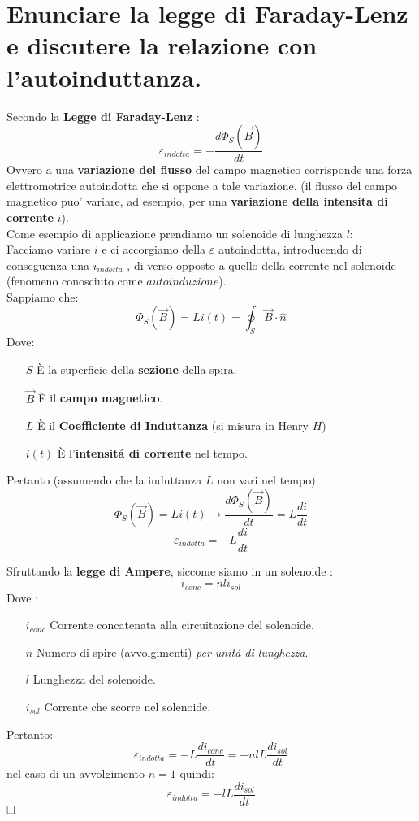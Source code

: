\section{Enunciare la legge di Faraday-Lenz e discutere la
	relazione con l'autoinduttanza.}
Secondo la \textbf{Legge di Faraday-Lenz} :
\begin{equation}
	\varepsilon_{indotta} = -\frac{d\Phi_S(\vec{B})}{dt}
\end{equation}
Ovvero a una \textbf{variazione del flusso} del campo magnetico corrisponde una forza elettromotrice autoindotta che si oppone a tale variazione. (il flusso del campo magnetico puo' variare, ad esempio, per una \textbf{variazione della intensita di corrente} $i$).\\
Come esempio di applicazione prendiamo un solenoide di lunghezza $l$:\\
Facciamo variare $i$ e ci accorgiamo della $\varepsilon$ autoindotta, introducendo di conseguenza una $i_{indotta}$ , di verso opposto a quello della corrente nel solenoide (fenomeno conosciuto come $autoinduzione$).\\
Sappiamo che:
$$
    \Phi_S(\vec{B}) = Li(t) = \oint_S{\vec{B} \cdot \hat{n}}
$$
Dove:
\begin{itemize}
	\item [$S$] {
	    \`E la superficie della \textbf{sezione} della spira.	
	}
	\item [$\vec{B}$] {
	    \`E il \textbf{campo magnetico}.
	}
	\item [$L$] {
		\`E il \textbf{Coefficiente di Induttanza} (si misura in Henry $H$)
	}
	\item[$i(t)$] {
	    \`E l'\textbf{intensit\'a di corrente} nel tempo.
	}
\end{itemize}
Pertanto (assumendo che la induttanza $L$ non vari nel tempo):
$$
    \Phi_S(\vec{B}) = Li(t) \rightarrow \frac{d\Phi_S(\vec{B})}{dt} = L\frac{di}{dt}
$$
$$
    \varepsilon_{indotta} = -L\frac{di}{dt}
$$

\pagebreak

\noindent Sfruttando la \textbf{legge di Ampere}, siccome siamo in un solenoide :
$$
    i_{conc} = n l i_{sol}
$$
\noindent Dove : 
\begin{itemize}
    \item [$i_{conc}$] {
    	Corrente concatenata alla circuitazione del solenoide.
    }
    \item [$n$] {
        Numero di spire (avvolgimenti) \textit{per unit\'a di lunghezza}.
    }
    \item [$l$] {
        Lunghezza del solenoide.
    }
    \item [$i_{sol}$] {
        Corrente che scorre nel solenoide.
    }
\end{itemize}
Pertanto: 
$$
    \varepsilon_{indotta} = -L\frac{di_{conc}}{dt} = -n l L \frac{di_{sol}}{dt}
$$
nel caso di un avvolgimento $n = 1$ quindi:
$$
    \varepsilon_{indotta} = -l L \frac{di_{sol}}{dt}
$$
$\hfill\square$